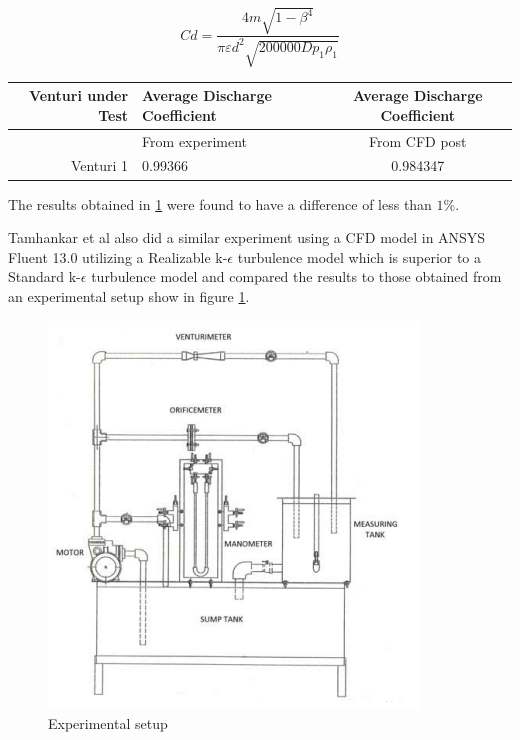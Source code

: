 \begin{equation}
C d=\frac{4 m \sqrt{1-\beta^{4}}}{\pi \varepsilon d^{2} \sqrt{200000 D p_{1} \rho_{1}}}
\label{eq:2}
\end{equation}

\begin{table}[!t]
  \begin{center}
    \leavevmode
     \begin{tabular}{rlc}\hline
      Venturi under Test & Average Discharge Coefficient &  Average Discharge Coefficient \\ \hline
       & From experiment &  From CFD post \\ \hline
      Venturi 1 & 0.99366 &  0.984347 \\ \hline
    \end{tabular}
    \label{tab:cd}
  \end{center}
\end{table}
The results obtained in \ref{tab:cd} were found to have a difference of less than $1 \%$.
\par
Tamhankar et al \cite{tamhankar2014experimental} also did a similar experiment using a CFD model in ANSYS Fluent 13.0 utilizing a Realizable k-$\epsilon$ turbulence model which is superior to a Standard k-$\epsilon$ turbulence model and compared the results to those obtained from an experimental setup show in figure \ref{fig:exp}. 

\begin{figure}[ht]
\includegraphics{Figures/exp.png}
\centering
\caption{ Experimental setup \cite{tamhankar2014experimental}}
\label{fig:exp}
\end{figure}

